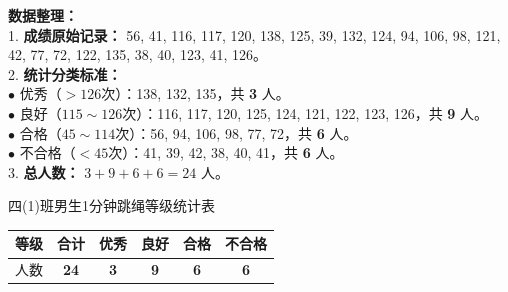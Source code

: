\documentclass[12pt, a4paper]{ctexart}
\begin{document}
\vspace{0.4cm}

{\small
\textbf{数据整理：} \\
1. \textbf{成绩原始记录：} 56, 41, 116, 117, 120, 138, 125, 39, 132, 124, 94, 106, 98, 121, 42, 77, 72, 122, 135, 38, 40, 123, 41, 126。 \\
2. \textbf{统计分类标准：} \\
   $\bullet$ 优秀（$>126$次）：138, 132, 135，共 \textbf{3} 人。 \\
   $\bullet$ 良好（$115 \sim 126$次）：116, 117, 120, 125, 124, 121, 122, 123, 126，共 \textbf{9} 人。 \\
   $\bullet$ 合格（$45 \sim 114$次）：56, 94, 106, 98, 77, 72，共 \textbf{6} 人。 \\
   $\bullet$ 不合格（$<45$次）：41, 39, 42, 38, 40, 41，共 \textbf{6} 人。 \\
3. \textbf{总人数：} $3 + 9 + 6 + 6 = 24$ 人。
}

\vspace{0.6cm}

\begin{center}
  {\small 四(1)班男生1分钟跳绳等级统计表} \\
  \vspace{0.2cm}
  \renewcommand{\arraystretch}{1.5}
  \begin{tabular}{|c|c|c|c|c|c|}
    \hline
    等级 & 合计 & 优秀 & 良好 & 合格 & 不合格 \\
    \hline
    人数 & \textbf{\textcolor{red!70!black}{24}} & \textbf{\textcolor{red!70!black}{3}} & \textbf{\textcolor{red!70!black}{9}} & \textbf{\textcolor{red!70!black}{6}} & \textbf{\textcolor{red!70!black}{6}} \\
    \hline
  \end{tabular}
\end{center}

\vspace{0.8cm}
\end{document}
